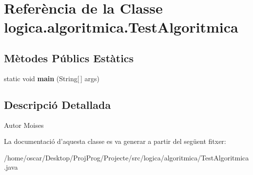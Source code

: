 \hypertarget{classlogica_1_1algoritmica_1_1_test_algoritmica}{\section{Referència de la Classe logica.\+algoritmica.\+Test\+Algoritmica}
\label{classlogica_1_1algoritmica_1_1_test_algoritmica}
}
\subsection*{Mètodes Públics Estàtics}
\begin{DoxyCompactItemize}
\item 
\hypertarget{classlogica_1_1algoritmica_1_1_test_algoritmica_a7203fdf29a8954e5b8ccef6aef9acfd3}{static void {\bfseries main} (String\mbox{[}$\,$\mbox{]} args)}\label{classlogica_1_1algoritmica_1_1_test_algoritmica_a7203fdf29a8954e5b8ccef6aef9acfd3}

\end{DoxyCompactItemize}


\subsection{Descripció Detallada}
\begin{DoxyAuthor}{Autor}
Moises 
\end{DoxyAuthor}


La documentació d'aquesta classe es va generar a partir del següent fitxer\+:\begin{DoxyCompactItemize}
\item 
/home/oscar/\+Desktop/\+Proj\+Prog/\+Projecte/src/logica/algoritmica/Test\+Algoritmica.\+java\end{DoxyCompactItemize}

